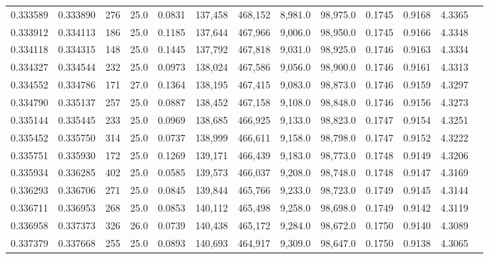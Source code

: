 \begin{tabular}{rrrrrrrrrrrrr}
0.333589 & 0.333890 &   276 & 25.0 &                                     0.0831 & 137,458 & 468,152 &   8,981.0 &  98,975.0 & 0.1745 & 0.9168 & 4.3365 \\
0.333912 & 0.334113 &   186 & 25.0 &                                     0.1185 & 137,644 & 467,966 &   9,006.0 &  98,950.0 & 0.1745 & 0.9166 & 4.3348 \\
0.334118 & 0.334315 &   148 & 25.0 &                                     0.1445 & 137,792 & 467,818 &   9,031.0 &  98,925.0 & 0.1746 & 0.9163 & 4.3334 \\
0.334327 & 0.334544 &   232 & 25.0 &                                     0.0973 & 138,024 & 467,586 &   9,056.0 &  98,900.0 & 0.1746 & 0.9161 & 4.3313 \\
0.334552 & 0.334786 &   171 & 27.0 &                                     0.1364 & 138,195 & 467,415 &   9,083.0 &  98,873.0 & 0.1746 & 0.9159 & 4.3297 \\
0.334790 & 0.335137 &   257 & 25.0 &                                     0.0887 & 138,452 & 467,158 &   9,108.0 &  98,848.0 & 0.1746 & 0.9156 & 4.3273 \\
0.335144 & 0.335445 &   233 & 25.0 &                                     0.0969 & 138,685 & 466,925 &   9,133.0 &  98,823.0 & 0.1747 & 0.9154 & 4.3251 \\
0.335452 & 0.335750 &   314 & 25.0 &                                     0.0737 & 138,999 & 466,611 &   9,158.0 &  98,798.0 & 0.1747 & 0.9152 & 4.3222 \\
0.335751 & 0.335930 &   172 & 25.0 &                                     0.1269 & 139,171 & 466,439 &   9,183.0 &  98,773.0 & 0.1748 & 0.9149 & 4.3206 \\
0.335934 & 0.336285 &   402 & 25.0 &                                     0.0585 & 139,573 & 466,037 &   9,208.0 &  98,748.0 & 0.1748 & 0.9147 & 4.3169 \\
0.336293 & 0.336706 &   271 & 25.0 &                                     0.0845 & 139,844 & 465,766 &   9,233.0 &  98,723.0 & 0.1749 & 0.9145 & 4.3144 \\
0.336711 & 0.336953 &   268 & 25.0 &                                     0.0853 & 140,112 & 465,498 &   9,258.0 &  98,698.0 & 0.1749 & 0.9142 & 4.3119 \\
0.336958 & 0.337373 &   326 & 26.0 &                                     0.0739 & 140,438 & 465,172 &   9,284.0 &  98,672.0 & 0.1750 & 0.9140 & 4.3089 \\
0.337379 & 0.337668 &   255 & 25.0 &                                     0.0893 & 140,693 & 464,917 &   9,309.0 &  98,647.0 & 0.1750 & 0.9138 & 4.3065 \\

\end{tabular}

